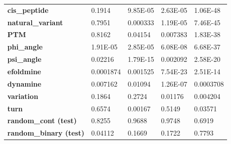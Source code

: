 \begin{table}[]
\begin{tabular}{@{}lllll@{}}
\textbf{cis\_peptide}         & \cellcolor[HTML]{F54D4D}0.1914         & 9.85E-05                                 & 2.63E-05                               & 1.06E-48                               \\
\textbf{natural\_variant}     & \cellcolor[HTML]{F54D4D}0.7951         & 0.000333                                 & 1.19E-05                               & 7.46E-45                               \\
\textbf{PTM}                  & \cellcolor[HTML]{F54D4D}0.8162         & 0.04154                                  & 0.007383                               & 1.83E-38                               \\
\textbf{phi\_angle}           & 1.91E-05                               & 2.85E-05                                 & 6.08E-08                               & 6.68E-37                               \\
\textbf{psi\_angle}           & 0.02216                                & 1.79E-15                                 & 0.002092                               & 2.58E-20                               \\
\textbf{efoldmine}            & 0.0001874                              & 0.001525                                 & 7.54E-23                               & 2.51E-14                               \\
\textbf{dynamine}             & 0.007162                               & 0.01094                                  & 1.26E-07                               & 0.0003708                              \\
\textbf{variation}            & \cellcolor[HTML]{F54D4D}0.1864         & \cellcolor[HTML]{F54D4D}0.2724           & 0.01176                                & 0.004204                               \\
\textbf{turn}                 & \cellcolor[HTML]{F54D4D}0.6574         & 0.00167                                  & \cellcolor[HTML]{F54D4D}0.5149         & 0.03571                                \\
\textbf{random\_cont (test)}         & \cellcolor[HTML]{F54D4D}0.8255         & \cellcolor[HTML]{F54D4D}0.9688           & \cellcolor[HTML]{F54D4D}0.9748         & \cellcolor[HTML]{F54D4D}0.6919         \\
\textbf{random\_binary (test)}       & 0.04112                                & \cellcolor[HTML]{F54D4D}0.1669           & \cellcolor[HTML]{F54D4D}0.1722         & \cellcolor[HTML]{F54D4D}0.7793         \\ \bottomrule

\end{tabular}
\end{table}
